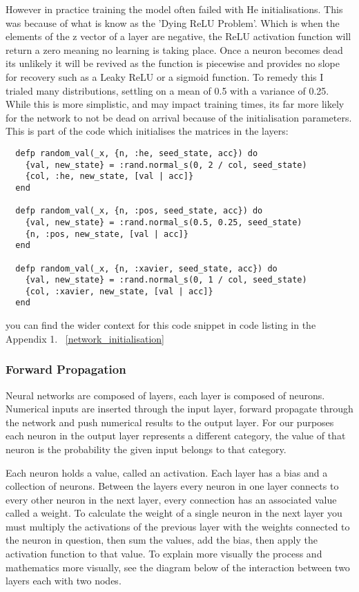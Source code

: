 However in practice training the model often failed with He initialisations.
This was because of what is know as the 'Dying ReLU Problem'. Which is when the
elements of the z vector of a layer are negative, the ReLU activation function
will return a zero meaning no learning is taking place. Once a neuron becomes
dead its unlikely it will be revived as the function is piecewise and provides
no slope for recovery such as a Leaky ReLU or a sigmoid function. To remedy this
I trialed many distributions, settling on a mean of 0.5 with a variance of 0.25.
While this is more simplistic, and may impact training times, its far more
likely for the network to not be dead on arrival because of the initialisation
parameters. This is part of the code which initialises the matrices in the layers:
\begin{lstlisting}
  defp random_val(_x, {n, :he, seed_state, acc}) do
    {val, new_state} = :rand.normal_s(0, 2 / col, seed_state)
    {col, :he, new_state, [val | acc]}
  end

  defp random_val(_x, {n, :pos, seed_state, acc}) do
    {val, new_state} = :rand.normal_s(0.5, 0.25, seed_state)
    {n, :pos, new_state, [val | acc]}
  end

  defp random_val(_x, {n, :xavier, seed_state, acc}) do
    {val, new_state} = :rand.normal_s(0, 1 / col, seed_state)
    {col, :xavier, new_state, [val | acc]}
  end
\end{lstlisting}

you can find the wider context for this code snippet in code listing in the Appendix 1. ~\ref{network_initialisation} 

\subsubsection{Forward Propagation}

Neural networks are composed of layers, each layer is composed of neurons.
Numerical inputs are inserted through the input layer, forward propagate through
the network and push numerical results to the output layer. For our purposes
each neuron in the output layer represents a different category, the value of
that neuron is the probability the given input belongs to that category.

Each neuron holds a value, called an activation. Each layer has a bias and a
collection of neurons. Between the layers every neuron in one layer connects to
every other neuron in the next layer, every connection has an associated value
called a weight. To calculate the weight of a single neuron in the next layer
you must multiply the activations of the previous layer with the weights
connected to the neuron in question, then sum the values, add the bias, then
apply the activation function to that value. To explain more visually the
process and mathematics more visually, see the diagram below of the interaction
between two layers each with two nodes.

